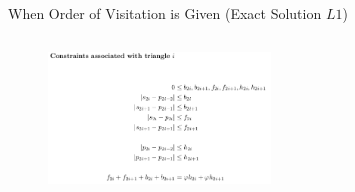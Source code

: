 \documentclass{beamer}
\begin{document}
\begin{frame}{When Order of Visitation is Given (Exact Solution $L1$)}
{\begin{columns}
    \begin{column}{0.5\textwidth}
      \begin{figure}
        \centering
        \includegraphics[width=5.9cm]{slide_imgs/tri.png}
      \end{figure}
     \end{column}
\end{columns}}



\end{frame}
\end{document}
